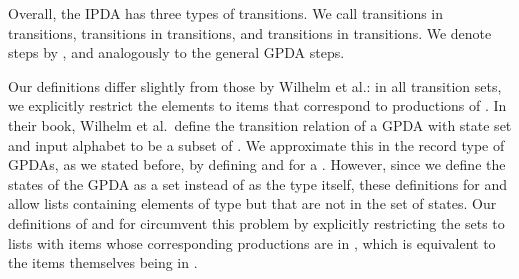 \begin{isabellebody}
\begin{isamarkuptext}
Overall, the IPDA has three types of transitions. We call transitions in   
transitions, transitions in   transitions, and transitions in 
  transitions. We denote  steps by ,  and
 analogously to the general GPDA steps. 

Our definitions differ slightly from those by Wilhelm et al.: in all
transition sets, we explicitly restrict the elements to items that correspond to productions of .
In their book, Wilhelm et al.\ define the transition relation of a GPDA with state set  and input
alphabet  to be a subset of \mbox{}. We approximate this in the record type of GPDAs, 
as we stated before, by defining \mbox{} and 
\mbox{} for a . However, since we define the states
of the GPDA as a set instead of as the type itself, these definitions for  and  allow 
lists containing elements of type  but that are not in the set of states. Our definitions of 
 and  for  circumvent this problem by explicitly restricting the sets to lists with
items whose corresponding productions are in , which is equivalent to the items themselves being
in .


\end{isamarkuptext}
\end{isabellebody}
